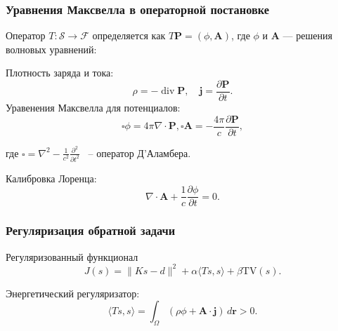 \documentclass{beamer}
\begin{document}
\begin{frame}
\frametitle{Уравнения Максвелла в операторной постановке}
Оператор $T: \mathcal{S} \to \mathcal{F}$ определяется как $T\mathbf{P} = (\phi, \mathbf{A})$, где $\phi$ и $\mathbf{A}$ --- решения волновых уравнений:

Плотность заряда и тока:
\begin{equation}
    \rho = -\operatorname{div} \mathbf{P}, \quad \mathbf{j} = \frac{\partial \mathbf{P}}{\partial t}.
\end{equation}
Уравенения Максвелла для потенциалов:
\begin{equation}\label{eq:maxwell}
    \square \phi = 4\pi \nabla \cdot \mathbf{P},
    \square \mathbf{A} = -\frac{4\pi}{c} \frac{\partial \mathbf{P}}{\partial t}, 
\end{equation}

где $\square = \nabla^2 - \frac{1}{c^2} \frac{\partial^2}{\partial t^2}$ ~-- оператор Д’Аламбера.

Калибровка Лоренца:
\begin{equation}
    \nabla \cdot \mathbf{A} + \frac{1}{c} \frac{\partial \phi}{\partial t} = 0.
\end{equation}



\end{frame}

\begin{frame}
\frametitle{Регуляризация обратной задачи}

\begin{block}{Регуляризованный функционал}
\begin{equation}
    J(s) = \|K s - d\|^2 + \alpha \langle T s, s \rangle + \beta \mathrm{TV}(s).
\end{equation}

Энергетический регуляризатор:
\begin{equation}
    \langle T s, s \rangle = \int_{\Omega} (\rho \phi + \mathbf{A} \cdot \mathbf{j}) \, d\mathbf{r} > 0.
\end{equation}
\end{block}

\end{frame}
\end{document}
